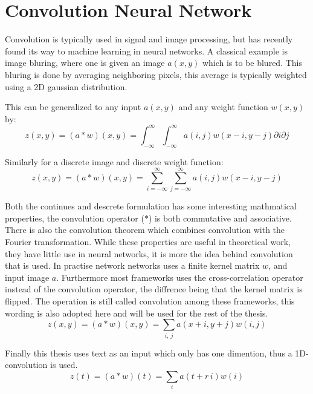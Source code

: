 \section{Convolution Neural Network}

Convolution is typically used in signal and image processing, but has recently found its way to machine learning in neural networks. A classical example is image bluring, where one is given an image $a(x, y)$ which is to be blured. This bluring is done by averaging neighboring pixels, this average is typically weighted using a 2D gaussian distribution.

This can be generalized to any input $a(x, y)$ and any weight function $w(x, y)$ by:
\begin{equation}
z(x, y) = (a * w)(x, y) = \int_{-\infty}^\infty \int_{-\infty}^\infty a(i, j) w(x - i, y - j) \partial i \partial j
\end{equation}

Similarly for a discrete image and discrete weight function:
\begin{equation}
z(x, y) = (a * w)(x, y) = \sum_{i = -\infty}^\infty \sum_{j = -\infty}^\infty a(i, j) w(x - i, y - j)
\end{equation}

Both the continues and descrete formulation has some interesting mathmatical properties, the convolution operator ($*$) is both commutative and associative. There is also the convolution theorem which combines convolution with the Fourier transformation. While these properties are useful in theoretical work, they have little use in neural networks, it is more the idea behind convolution that is used. In practise network networks uses a finite kernel matrix $w$, and input image $a$. Furthermore most frameworks uses the cross-correlation operator instead of the convolution operator, the diffrence being that the kernel matrix is flipped. The operation is still called convolution among these frameworks, this wording is also adopted here and will be used for the rest of the thesis.
\begin{equation}
z(x, y) = (a * w)(x, y) = \sum_{i,\ j} a(x + i, y + j) w(i, j)
\end{equation}

Finally this thesis uses text as an input which only has one dimention, thus a 1D-convolution is used.
\begin{equation}
z(t) = (a * w)(t) = \sum_{i} a(t+r\,i) w(i)
\end{equation}

